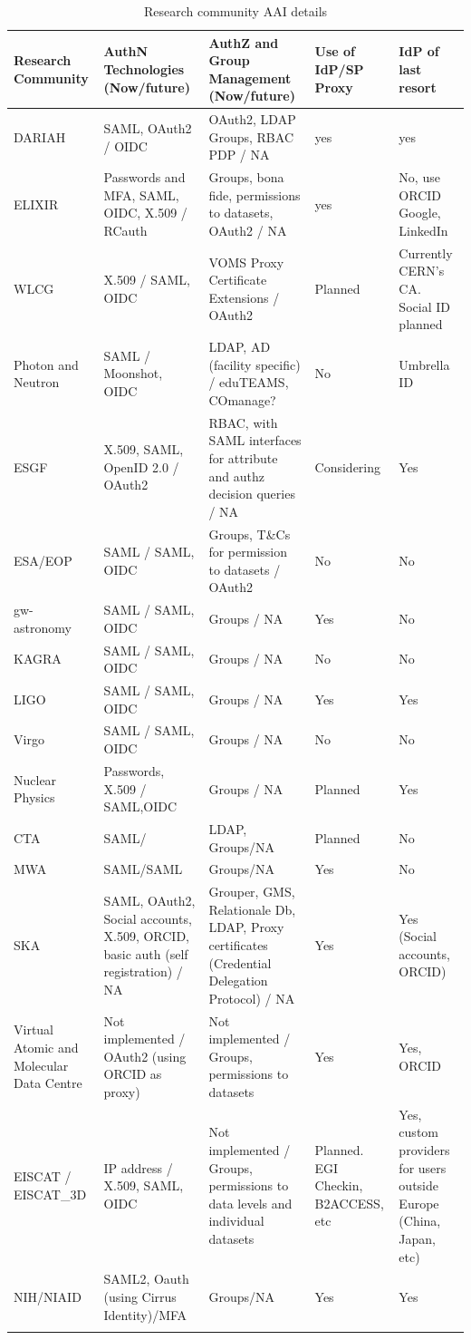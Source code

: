 \documentclass[fleqn,11pt]{wlscirep}
\begin{document}
{\begin{center}
\begin{longtable}{|p{3cm}|*{4}{p{}|}}
\hline
Research Community&AuthN Technologies (Now/future)&AuthZ and Group Management (Now/future)&Use of IdP/SP Proxy&IdP of last resort\\
\hline\hline
\endhead
DARIAH&SAML, OAuth2 / OIDC&OAuth2, LDAP Groups, RBAC PDP / NA&yes&yes\\
\hline
ELIXIR&Passwords and MFA, SAML, OIDC, X.509 / RCauth&Groups, bona fide, permissions to datasets, OAuth2 / NA&yes&No, use ORCID Google, LinkedIn\\
\hline
WLCG&X.509 / SAML,   OIDC&VOMS Proxy Certificate Extensions / OAuth2&Planned&Currently CERN’s CA. Social ID planned\\
\hline
Photon and Neutron&SAML / Moonshot, OIDC&LDAP, AD (facility specific) / eduTEAMS, COmanage?&No&Umbrella ID \\
\hline
ESGF&X.509, SAML, OpenID 2.0 / OAuth2&RBAC, with SAML interfaces for attribute and authz decision queries / NA&Considering&Yes\\
\hline
ESA/EOP&SAML / SAML, OIDC&Groups, T\&Cs for permission to datasets / OAuth2&No&No\\
\hline
gw-astronomy&SAML / SAML, OIDC&Groups / NA&Yes&No\\
\hline
KAGRA&SAML / SAML, OIDC&Groups / NA&No&No\\
\hline
LIGO&SAML / SAML, OIDC&Groups / NA&Yes&Yes\\
\hline
Virgo&SAML / SAML, OIDC&Groups / NA&No&No\\
\hline
Nuclear Physics&Passwords, X.509 / SAML,OIDC&Groups / NA&Planned&Yes\\
\hline
CTA &SAML/&LDAP, Groups/NA&Planned&No\\
\hline
MWA&SAML/SAML&Groups/NA&Yes&No\\
\hline
SKA&SAML, OAuth2, Social accounts, X.509, ORCID, basic auth (self registration) / NA&Grouper, GMS, Relationale Db, LDAP, Proxy certificates (Credential Delegation Protocol) / NA&Yes&Yes (Social accounts, ORCID)\\
\hline
Virtual Atomic and Molecular Data Centre&Not implemented / OAuth2 (using ORCID as proxy)&Not implemented / Groups, permissions to datasets&Yes&Yes, ORCID \\
\hline
EISCAT / EISCAT\_3D&IP address / X.509, SAML, OIDC&Not implemented / Groups, permissions to data levels and individual datasets&Planned. EGI Checkin, B2ACCESS, etc&Yes, custom providers for users outside Europe (China, Japan, etc) \\
\hline
NIH/NIAID&SAML2, Oauth (using Cirrus Identity)/MFA&Groups/NA&Yes&Yes\\ 
\hline
\caption{Research community AAI details}
\label{tab:table2}
\end{longtable}
\end{center}

}
\end{document}
